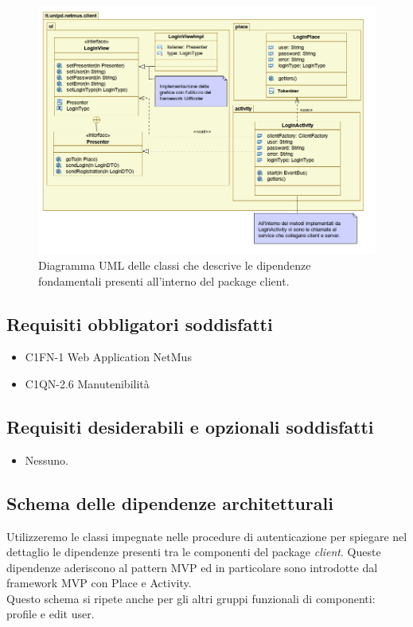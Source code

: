 \begin{figure}[!h]
  \centering
  \includegraphics[width=14cm]{img/DP/package.png}
\caption{Diagramma UML delle classi che descrive le dipendenze
fondamentali presenti all'interno del package client.}
\end{figure}

\subsection*{Requisiti obbligatori soddisfatti}
\begin{itemize}
	\item C1FN-1 Web Application NetMus
	\item C1QN-2.6 Manutenibilit\`a
\end{itemize}
\subsection*{Requisiti desiderabili e opzionali soddisfatti}
\begin{itemize}
    \item Nessuno.
\end{itemize}
\subsection*{Schema delle dipendenze architetturali}
Utilizzeremo le classi impegnate nelle procedure di autenticazione per spiegare
nel dettaglio le dipendenze presenti tra le componenti del package
\emph{client}. 
Queste dipendenze aderiscono al pattern MVP ed in particolare sono introdotte
dal framework MVP con Place e Activity.\\
Questo schema si ripete anche per gli altri gruppi funzionali di componenti:
profile e edit user.


